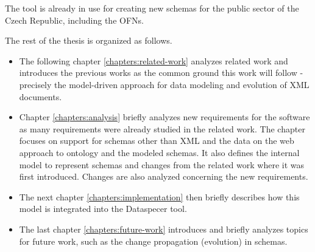 The tool is already in use for creating new schemas for the public sector of the Czech Republic, including the OFNs.

\bigskip

\noindent The rest of the thesis is organized as follows.

\begin{itemize}
    \item The following chapter \ref{chapters:related-work} analyzes related work and introduces the previous works as the common ground this work will follow - precisely the model-driven approach for data modeling and evolution of XML documents.
    \item Chapter \ref{chapters:analysis} briefly analyzes new requirements for the software as many requirements were already studied in the related work. The chapter focuses on support for schemas other than XML and the data on the web \cite{data-on-the-web} approach to ontology and the modeled schemas.
    It also defines the internal model to represent schemas and changes from the related work where it was first introduced. Changes are also analyzed concerning the new requirements.
    \item The next chapter \ref{chapters:implementation} then briefly describes how this model is integrated into the Dataspecer tool.
    \item The last chapter \ref{chapters:future-work} introduces and briefly analyzes topics for future work, such as the change propagation (evolution) in schemas.
\end{itemize}

